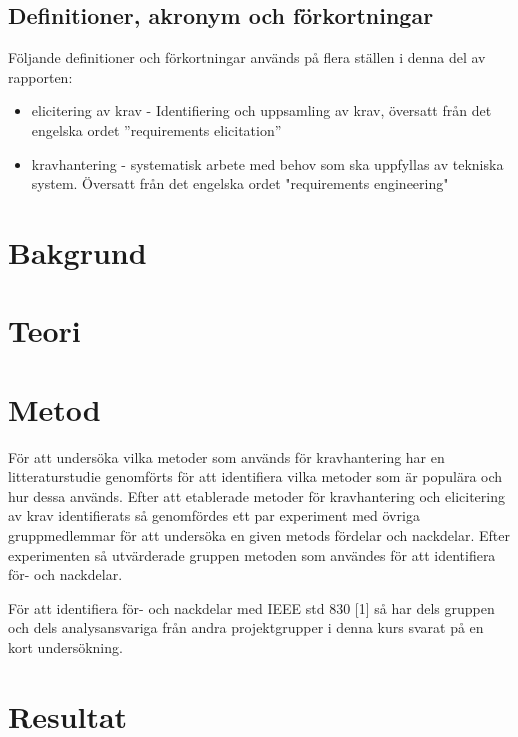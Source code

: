 \subsection{Definitioner, akronym och förkortningar}
Följande definitioner och förkortningar används på flera ställen i denna del av rapporten:
\begin{itemize}
	\item elicitering av krav - Identifiering och uppsamling av krav, översatt från det engelska ordet ”requirements elicitation”
	\item kravhantering - systematisk arbete med behov som ska uppfyllas av tekniska system. Översatt från det engelska ordet "requirements engineering"
\end{itemize}
\section{Bakgrund}
\label{sec:background-jannering}


\section{Teori}
\label{sec:theory-jannering}


\section{Metod}
\label{sec:method-jannering}

För att undersöka vilka metoder som används för kravhantering har en litteraturstudie genomförts för att identifiera vilka metoder som är populära och hur dessa används. Efter att etablerade metoder för kravhantering och elicitering av krav identifierats så genomfördes ett par experiment med övriga gruppmedlemmar för att undersöka en given metods fördelar och nackdelar. Efter experimenten så utvärderade gruppen metoden som användes för att identifiera för- och nackdelar. 

För att identifiera för- och nackdelar med IEEE std 830 [1] så har dels gruppen och dels analysansvariga från andra projektgrupper i denna kurs svarat på en kort undersökning.


\section{Resultat}
\label{sec:results-jannering}

